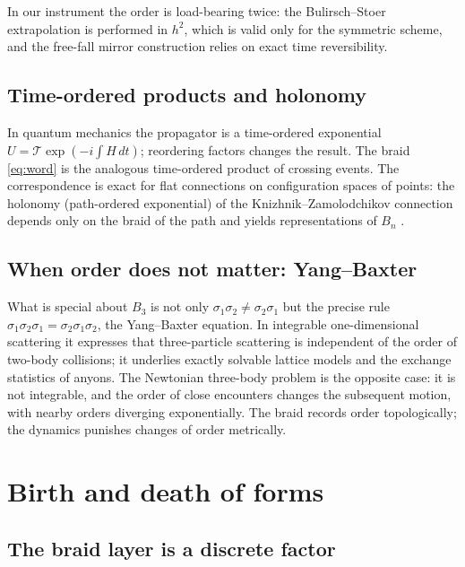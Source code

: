 \documentclass[11pt]{article}
\theoremstyle{remark}
\begin{document}
In our instrument the order is load-bearing twice: the Bulirsch--Stoer extrapolation is performed in $h^2$,
which is valid only for the symmetric scheme, and the free-fall mirror construction relies on exact time
reversibility.

\subsection{Time-ordered products and holonomy}

In quantum mechanics the propagator is a time-ordered exponential $U=\mathcal T\exp(-i\!\int H\,dt)$; reordering
factors changes the result. The braid \eqref{eq:word} is the analogous time-ordered product of crossing
events. The correspondence is exact for flat connections on configuration spaces of points: the holonomy
(path-ordered exponential) of the Knizhnik--Zamolodchikov connection depends only on the braid of the path
and yields representations of $B_n$ \cite{KasselTuraev2008}.

\subsection{When order does not matter: Yang--Baxter}

What is special about $B_3$ is not only $\sigma_1\sigma_2\neq\sigma_2\sigma_1$ but the precise rule
$\sigma_1\sigma_2\sigma_1=\sigma_2\sigma_1\sigma_2$, the Yang--Baxter equation. In integrable one-dimensional
scattering it expresses that three-particle scattering is independent of the order of two-body collisions;
it underlies exactly solvable lattice models and the exchange statistics of anyons. The Newtonian three-body
problem is the opposite case: it is not integrable, and the order of close encounters changes the subsequent
motion, with nearby orders diverging exponentially. The braid records order topologically; the dynamics
punishes changes of order metrically.

\section{Birth and death of forms}
\label{sec:forms}

\subsection{The braid layer is a discrete factor}
\end{document}
